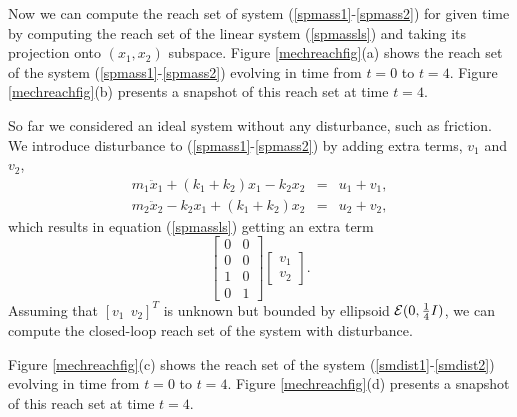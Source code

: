 Now we can compute the reach set of system (\ref{spmass1}-\ref{spmass2})
for given time by computing the reach set of the linear system (\ref{spmassls})
and taking its projection onto $(x_1, x_2)$ subspace.
\newpage
{}
Figure \ref{mechreachfig}(a) shows the reach set of the system
(\ref{spmass1}-\ref{spmass2}) evolving in time from $t=0$ to $t=4$.
Figure \ref{mechreachfig}(b) presents a snapshot of this reach set at time
$t=4$.


So far we considered an ideal system without any disturbance, such as friction.
We introduce disturbance to (\ref{spmass1}-\ref{spmass2}) by adding extra
terms, $v_1$ and $v_2$,
\begin{eqnarray}
m_1\ddot{x}_1+(k_1+k_2)x_1-k_2x_2 & = & u_1 + v_1, \label{smdist1}\\
m_2\ddot{x}_2-k_2x_1+(k_1+k_2)x_2 & = & u_2 + v_2, \label{smdist2}
\end{eqnarray}
which results in equation (\ref{spmassls}) getting an extra term
\[ \left[\begin{array}{cc}
0 & 0\\
0 & 0\\
1 & 0\\
0 & 1\end{array}\right]\left[\begin{array}{c}
v_1\\
v_2\end{array}\right]. \]
Assuming that $[v_1 ~~ v_2]^T$ is unknown but bounded by ellipsoid
$\EE(0, \frac{1}{4}I)$, we can compute the closed-loop reach set of the system
with disturbance.

Figure \ref{mechreachfig}(c) shows the reach set of the system
(\ref{smdist1}-\ref{smdist2}) evolving in time from $t=0$ to $t=4$.
Figure \ref{mechreachfig}(d) presents a snapshot of this reach set at time
$t=4$.



